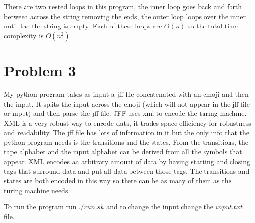 \documentclass[12pt]{article}
\begin{document}
There are two nested loops in this program, the inner loop goes back and forth between across the string removing the ends, the outer loop loops over the inner until the the string is empty. Each of these loops are $O(n)$ so the total time complexity is $O(n^2)$.

\section{Problem 3}

My python program takes as input a jff file concatenated with an emoji and then the input. It splits the input across the emoji (which will not appear in the jff file or input) and then parse the jff file. JFF uses xml to encode the turing machine. XML is a very robust way to encode data, it trades space efficiency for robustness and readability. The jff file has lots of information in it but the only info that the python program needs is the transitions and the states. From the transitions, the tape alphabet and the input alphabet can be derived from all the symbols that appear. XML encodes an arbitrary amount of data by having starting and closing tags that surround data and put all data between those tags. The transitions and states are both encoded in this way so there can be as many of them as the turing machine needs.

To run the program run $./run.sh$ and to change the input change the $input.txt$ file.
\end{document}
